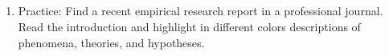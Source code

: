 \subsection{}

\begin{fullwidth}

\begin{enumerate}

\item Practice: Find a recent empirical research report in a professional journal. Read the introduction and highlight in different colors descriptions of phenomena, theories, and hypotheses.

\end{enumerate}

\end{fullwidth}
